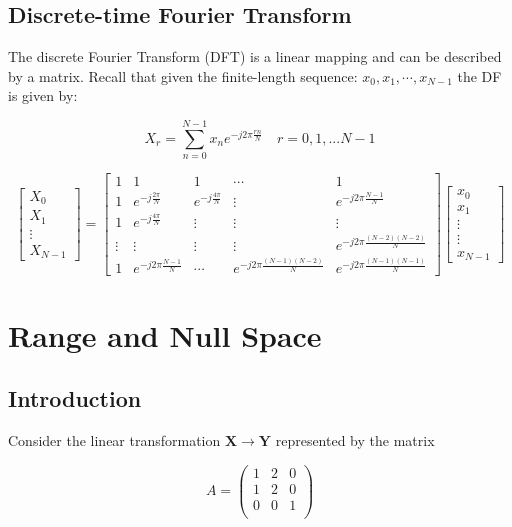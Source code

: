 \subsection{Discrete-time Fourier Transform}

The discrete Fourier Transform (DFT) is a linear mapping and can be described by a matrix. Recall that given the finite-length sequence: $x_0, x_1, \cdots, x_{N-1}$ the DF is given by:

\[X_{r}=\sum_{n=0}^{N-1}x_{n}e^{-j2\pi\frac{rn}{N}}\quad r=0,1,...N-1\]

\[\begin{bmatrix}X_0\\X_1\\\vdots\\X_{N-1}\end{bmatrix}=\begin{bmatrix}1&1&1&\cdots&1\\1&e^{-j\frac{2\pi}N}&e^{-j\frac{4\pi}N}&\vdots&e^{-j2\pi\frac{N-1}N}\\1&e^{-j\frac{4\pi}N}&\vdots&\vdots&\vdots\\\vdots&\vdots&\vdots&\vdots&e^{-j2\pi\frac{(N-2)(N-2)}N}\\1&e^{-j2\pi\frac{N-1}N}&\cdots&e^{-j2\pi\frac{(N-1)(N-2)}N}&e^{-j2\pi\frac{(N-1)(N-1)}N}\end{bmatrix}\begin{bmatrix}x_0\\x_1\\\vdots\\\vdots\\x_{N-1}\end{bmatrix}\]





\section{Range and Null Space}

\subsection{Introduction}

Consider the linear transformation \( \mathbf{X} \rightarrow \mathbf{Y} \) represented by the matrix

\[ A = \begin{pmatrix}
1 & 2 & 0 \\
1 & 2 & 0 \\
0 & 0 & 1 \\
\end{pmatrix} \]

